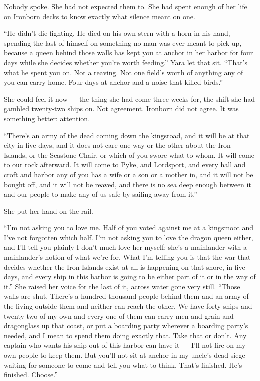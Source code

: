 Nobody spoke. She had not expected them to. She had spent enough of her life on Ironborn decks to know exactly what silence meant on one.

“He didn’t die fighting. He died on his own stern with a horn in his hand, spending the last of himself on something no man was ever meant to pick up, because a queen behind those walls has kept you at anchor in her harbor for four days while she decides whether you’re worth feeding.” Yara let that sit. “That’s what he spent you on. Not a reaving. Not one field’s worth of anything any of you can carry home. Four days at anchor and a noise that killed birds.”

She could feel it now — the thing she had come three weeks for, the shift she had gambled twenty-two ships on. Not agreement. Ironborn did not agree. It was something better: attention.

“There’s an army of the dead coming down the kingsroad, and it will be at that city in five days, and it does not care one way or the other about the Iron Islands, or the Seastone Chair, or which of you swore what to whom. It will come to our rock afterward. It will come to Pyke, and Lordsport, and every hall and croft and harbor any of you has a wife or a son or a mother in, and it will not be bought off, and it will not be reaved, and there is no sea deep enough between it and our people to make any of us safe by sailing away from it.”

She put her hand on the rail.

“I’m not asking you to love me. Half of you voted against me at a kingsmoot and I’ve not forgotten which half. I’m not asking you to love the dragon queen either, and I’ll tell you plainly I don’t much love her myself; she’s a mainlander with a mainlander’s notion of what we’re for. What I’m telling you is that the war that decides whether the Iron Islands exist at all is happening on that shore, in five days, and every ship in this harbor is going to be either part of it or in the way of it.” She raised her voice for the last of it, across water gone very still. “Those walls are shut. There’s a hundred thousand people behind them and an army of the living outside them and neither can reach the other. We have forty ships and twenty-two of my own and every one of them can carry men and grain and dragonglass up that coast, or put a boarding party wherever a boarding party’s needed, and I mean to spend them doing exactly that. Take that or don’t. Any captain who wants his ship out of this harbor can have it — I’ll not fire on my own people to keep them. But you’ll not sit at anchor in my uncle’s dead siege waiting for someone to come and tell you what to think. That’s finished. He’s finished. Choose.”

